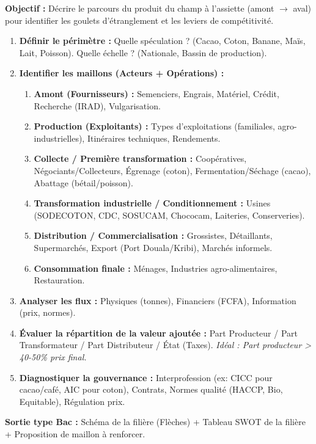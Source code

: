 \documentclass[11pt]{article}
\begin{document}
\begin{methode}
\textbf{Objectif :} Décrire le parcours du produit du champ à l'assiette (amont $\to$ aval) pour identifier les goulets d'étranglement et les leviers de compétitivité.
\begin{enumerate}
    \item \textbf{Définir le périmètre :} Quelle spéculation ? (Cacao, Coton, Banane, Maïs, Lait, Poisson). Quelle échelle ? (Nationale, Bassin de production).
    \item \textbf{Identifier les maillons (Acteurs + Opérations) :}
    \begin{enumerate}
        \item \textbf{Amont (Fournisseurs) :} Semenciers, Engrais, Matériel, Crédit, Recherche (IRAD), Vulgarisation.
        \item \textbf{Production (Exploitants) :} Types d'exploitations (familiales, agro-industrielles), Itinéraires techniques, Rendements.
        \item \textbf{Collecte / Première transformation :} Coopératives, Négociants/Collecteurs, Égrenage (coton), Fermentation/Séchage (cacao), Abattage (bétail/poisson).
        \item \textbf{Transformation industrielle / Conditionnement :} Usines (SODECOTON, CDC, SOSUCAM, Chococam, Laiteries, Conserveries).
        \item \textbf{Distribution / Commercialisation :} Grossistes, Détaillants, Supermarchés, Export (Port Douala/Kribi), Marchés informels.
        \item \textbf{Consommation finale :} Ménages, Industries agro-alimentaires, Restauration.
    \end{enumerate}
    \item \textbf{Analyser les flux :} Physiques (tonnes), Financiers (FCFA), Information (prix, normes).
    \item \textbf{Évaluer la répartition de la valeur ajoutée :} Part Producteur / Part Transformateur / Part Distributeur / État (Taxes). \emph{Idéal : Part producteur > 40-50\% prix final.}
    \item \textbf{Diagnostiquer la gouvernance :} Interprofession (ex: CICC pour cacao/café, AIC pour coton), Contrats, Normes qualité (HACCP, Bio, Equitable), Régulation prix.
\end{enumerate}
\textbf{Sortie type Bac :} Schéma de la filière (Flèches) + Tableau SWOT de la filière + Proposition de maillon à renforcer.
\end{methode}
\end{document}
